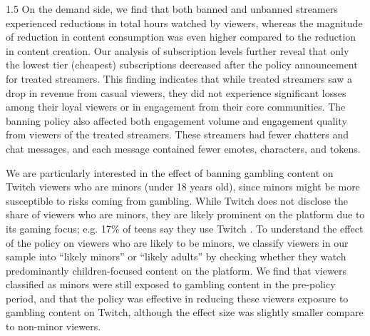 \documentclass[a4paper,12pt]{article}
\begin{document}
\begin{spacing}{1.5}
On the demand side, we find that both banned and unbanned streamers experienced reductions in total hours watched by viewers, whereas the magnitude of reduction in content consumption was even higher compared to the reduction in content creation. Our analysis of subscription levels further reveal that only the lowest tier (cheapest) subscriptions decreased after the policy announcement for treated streamers. This finding indicates that while treated streamers saw a drop in revenue from casual viewers, they did not experience significant losses among their loyal viewers or in engagement from their core communities. The banning policy also affected both engagement volume and engagement quality from viewers of the treated streamers. These streamers had fewer chatters and chat messages, and each message contained fewer emotes, characters, and tokens.

We are particularly interested in the effect of banning gambling content on Twitch viewers who are minors (under 18 years old), since minors might be more susceptible to risks coming from gambling. While Twitch does not disclose the share of viewers who are minors, they are likely prominent on the platform due to its gaming focus; e.g. 17\% of teens say they use Twitch \citep{PewResearch2023}. To understand the effect of the policy on viewers who are likely to be minors, we classify viewers in our sample into ``likely minors'' or ``likely adults'' by checking whether they watch predominantly children-focused content on the platform. We find that viewers classified as minors were still exposed to gambling content in the pre-policy period, and that the policy was effective in reducing these viewers exposure to gambling content on Twitch, although the effect size was slightly smaller compare to non-minor viewers. 



\end{spacing}
\end{document}
